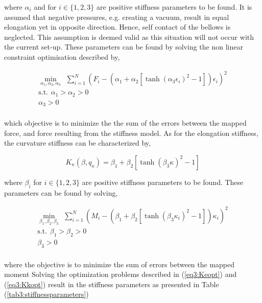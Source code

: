 where $\alpha_i$ and  for $i \in \{1,2,3\} $ are positive stiffness parameters to be found. It is assumed that negative pressures, e.g. creating a vacuum, result in equal elongation yet in opposite direction. Hence, self contact of the bellows is neglected. This assumption is deemed valid as this situation will not occur with the current set-up. These parameters can be found by solving the non linear constraint optimisation described by,


\begin{equation}
\begin{aligned}
\min_{\alpha_1,\alpha_2,\alpha_3} \hspace{5pt} \sum_{i=1}^{N}(F_i -  (\alpha_1 + \alpha_2 [\tanh({\alpha_3 \epsilon_i})^2 -1])\epsilon_i)^2    \\ 
\text{s.t.} \hspace{5pt} \alpha_1 > \alpha_2 > 0 \\
\alpha_3 > 0 \\ 
\label{eq3:Keopt}
\end{aligned}
\end{equation}

which objective is to minimize the the sum of the errors between the mapped force, and force resulting from the stiffness model. As for the elongation stiffness, the curvature stiffness can be characterized by,

\begin{equation}
    K_\kappa(\beta,q_\kappa) =  \beta_1 + \beta_2 [\tanh({\beta_3 \kappa})^2 -1]
\end{equation}


where $\beta_i$ for $i \in \{1,2,3\} $ are positive stiffness parameters to be found. These parameters can be found by solving,

\begin{equation}
\begin{aligned}
\min_{\beta_1,\beta_2,\beta_3} \hspace{5pt} \sum_{i=1}^{N}(M_i -  (\beta_1 + \beta_2 [\tanh({\beta_3 {\kappa_i}})^2 -1]){\kappa_i})^2    \\ 
\text{s.t.} \hspace{5pt} \beta_1 > \beta_2 > 0 \\
\beta_3 > 0 \\ 
\label{eq3:Kkopt}
\end{aligned}
\end{equation}



where the objective is to minimize the sum of errors between the mapped moment Solving the optimization problems described in (\ref{eq3:Keopt}) and (\ref{eq3:Kkopt}) result in the stiffness parameters as presented in Table (\ref{tab3:stiffnessparameters})

